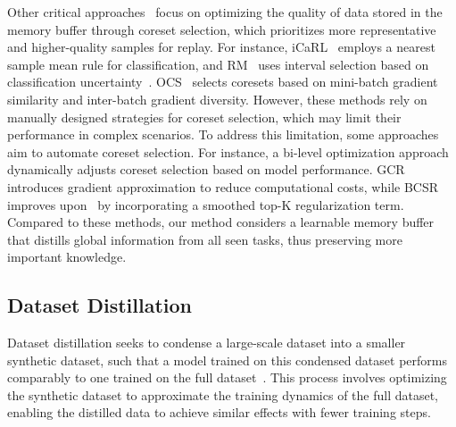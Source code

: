 \documentclass[table, xcdraw]{article}
\theoremstyle{plain}
\theoremstyle{definition}
\theoremstyle{remark}
\begin{document}
Other critical approaches~\cite{icarl,GSSaljundi2019gradient,OCSyoon2021online} focus on optimizing the quality of data stored in the memory buffer through coreset selection, which prioritizes more representative and higher-quality samples for replay. For instance, iCaRL~\cite{icarl} employs a nearest sample mean rule for classification, and RM~\cite{RMbang2021rainbow} uses interval selection based on classification uncertainty~\cite{uncertaintygal2016dropout}. OCS~\cite{OCSyoon2021online} selects coresets based on mini-batch gradient similarity and inter-batch gradient diversity. However, these methods rely on manually designed strategies for coreset selection, which may limit their performance in complex scenarios. To address this limitation, some approaches aim to automate coreset selection. For instance, a bi-level optimization approach~\cite{borsos2020coresets} dynamically adjusts coreset selection based on model performance. GCR~\cite{GCRtiwari2022gcr} introduces gradient approximation to reduce computational costs, while BCSR~\cite{BCSRhao2024bilevel} improves upon~\cite{zhou2022probabilistic} by incorporating a smoothed top-K regularization term. Compared to these methods, our method considers a learnable memory buffer that distills global information from all seen tasks, thus preserving more important knowledge.

\subsection{Dataset Distillation}
Dataset distillation seeks to condense a large-scale dataset into a smaller synthetic dataset, such that a model trained on this condensed dataset performs comparably to one trained on the full dataset~\cite{DDwang2018dataset}. This process involves optimizing the synthetic dataset to approximate the training dynamics of the full dataset, enabling the distilled data to achieve similar effects with fewer training steps.
\end{document}
